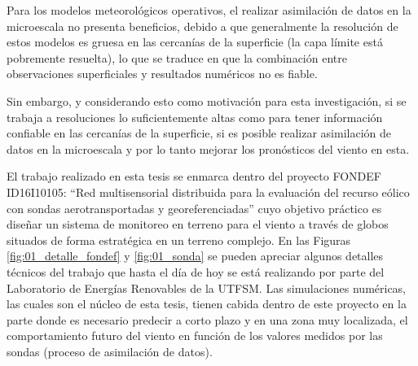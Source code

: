 Para los modelos meteorológicos operativos, el realizar asimilación de datos en la microescala no presenta beneficios, debido a que generalmente la resolución de estos modelos es gruesa en las cercanías de la superficie (la capa límite está pobremente resuelta), lo que se traduce en que la combinación entre observaciones superficiales y resultados numéricos no es fiable.

Sin embargo, y considerando esto como motivación para esta investigación, si se trabaja a resoluciones lo suficientemente altas como para tener información confiable en las cercanías de la superficie, si es posible realizar asimilación de datos en la microescala y por lo tanto mejorar los pronósticos del viento en esta.

El trabajo realizado en esta tesis se enmarca dentro del proyecto FONDEF ID16I10105: ``Red multisensorial distribuida para la evaluación del recurso eólico con sondas aerotransportadas y georeferenciadas'' cuyo objetivo práctico es diseñar un sistema de monitoreo en terreno para el viento a través de globos situados de forma estratégica en un terreno complejo. En las Figuras \ref{fig:01_detalle_fondef} y \ref{fig:01_sonda} se pueden apreciar algunos detalles técnicos del trabajo que hasta el día de hoy se está realizando por parte del Laboratorio de Energías Renovables de la UTFSM. Las simulaciones numéricas, las cuales son el núcleo de esta tesis, tienen cabida dentro de este proyecto en la parte donde es necesario predecir a corto plazo y en una zona muy localizada, el comportamiento futuro del viento en función de los valores medidos por las sondas (proceso de asimilación de datos).

